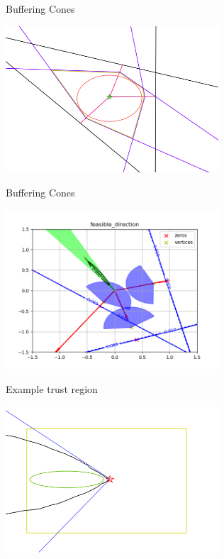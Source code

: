 \documentclass{beamer}
\begin{document}
\begin{frame}{Buffering Cones}
	\begin{center}
		\includegraphics[width=300px]{images/completed_2.png}
	\end{center}
\end{frame}

\begin{frame}{Buffering Cones}
	\begin{center}
		\includegraphics[width=300px]{images/feasible_direction.png}
	\end{center}
\end{frame}



\begin{frame}{Example trust region}
\begin{center}
    \includegraphics[width=300px]{images/trust_regions.png}
\end{center}
\end{frame}
\end{document}
